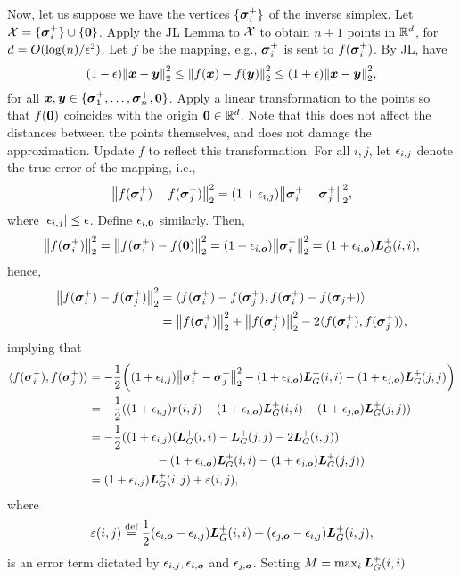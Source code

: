 

Now, let us suppose we have the vertices $\{\vb*{\sigma}_i^+\}$ of the inverse simplex. Let $\mathcal{X} = \{\vb*{\sigma}_i^+\}\cup\{\vb{0}\}$. Apply the JL Lemma to $\mathcal{X}$ to  obtain $n+1$ points in $\mathbb{R}^d$, for $d=O(\log(n)/\epsilon^2)$. Let $f$ be the mapping, e.g., $\vb*{\sigma}_i^+$ is sent to $f(\vb*{\sigma}_i^+)$. By JL, have 
\[(1-\epsilon)\norm{\vb*{x}-\vb*{y}}_2^2\leq  \norm{f(\vb*{x}) -f(\vb*{y})}_2^2\leq (1+\epsilon)\norm{\vb*{x}-\vb*{y}}_2^2, \]
for all $\vb*{x},\vb*{y}\in \{\vb*{\sigma}_1^+,\dots,\vb*{\sigma}_n^+,\vb{0}\}$. 
Apply a linear transformation to the points so that $f(\vb{0})$ coincides with the origin $\vb{0}\in\mathbb{R}^d$. Note that this does not affect the distances between the points themselves, and does not damage the approximation. Update $f$ to reflect this transformation. 
For all $i,j$, let $\epsilon_{i,j}$ denote the true error of the mapping, i.e., 
\[\norm{f(\vb*{\sigma}_i^+)-f(\vb*{\sigma}_j^+)}_2^2 = (1+\epsilon_{i,j})\norm{\vb*{\sigma}_i^+-\vb*{\sigma}_j^+}_2^2,\]
where $|\epsilon_{i,j}|\leq \epsilon$. Define $\epsilon_{i,\vb{0}}$ similarly. 
Then, 
\[\norm{f(\vb*{\sigma}_i^+)}_2^2 = \norm{f(\vb*{\sigma}_i^+)-f(\vb{0})}_2^2 = (1+\epsilon_{i,\vb*{o}})\norm{\vb*{\sigma}_i^+}_2^2 = (1+\epsilon_{i,\vb*{o}})\vb*{L}_G^+(i,i),\]
hence, 
\begin{align*}
\norm{f(\vb*{\sigma}_i^+)-f(\vb*{\sigma}_j^+)}_2^2 &= \langle f(\vb*{\sigma}_i^+)-f(\vb*{\sigma}_j^+),f(\vb*{\sigma}_i^+)-f(\vb*{\sigma}_j+)\rangle \\
&= \norm{f(\vb*{\sigma}_i^+)}_2^2 + \norm{f(\vb*{\sigma}_j^+)}_2^2 - 2\langle f(\vb*{\sigma}_i^+),f(\vb*{\sigma}_j^+)\rangle,  
\end{align*}
implying that 
\begin{align*}
\langle f(\vb*{\sigma}_i^+),f(\vb*{\sigma}_j^+) \rangle &= -\frac{1}{2} \bigg((1+\epsilon_{i,j})\norm{\vb*{\sigma}_i^+-\vb*{\sigma}_j^+}_2^2 - (1+\epsilon_{i,\vb*{o}})\vb*{L}_G^+(i,i) - (1+\epsilon_{j,\vb*{o}})\vb*{L}_G^+(j,j)\bigg) \\
&= -\frac{1}{2}((1+\epsilon_{i,j})r(i,j) - (1+\epsilon_{i,\vb*{o}})\vb*{L}_G^+(i,i) - (1+\epsilon_{j,\vb*{o}})\vb*{L}_G^+(j,j)) \\
&= -\frac{1}{2}((1+\epsilon_{i,j})(\vb*{L}_G^+(i,i) - \vb*{L}_G^+(j,j) - 2\vb*{L}_G^+(i,j)) \\
&\hspace{2cm}- (1+\epsilon_{i,\vb*{o}})\vb*{L}_G^+(i,i) - (1+\epsilon_{j,\vb*{o}})\vb*{L}_G^+(j,j))\\
&= (1+\epsilon_{i,j})\vb*{L}_G^+(i,j) + \varepsilon(i,j),
\end{align*}
where 
\[\varepsilon(i,j)\overset{\text{def}}{=} \frac{1}{2}(\epsilon_{i,\vb*{o}}-\epsilon_{i,j})\vb*{L}_G^+(i,i) + (\epsilon_{j,\vb*{o}}-\epsilon_{i,j})\vb*{L}_G^+(i,j),\]
is an error term dictated by $\epsilon_{i,j}, \epsilon_{i,\vb*{o}}$ and $\epsilon_{j,\vb*{o}}$. Setting $M= \max_i \vb*{L}_G^+(i,i)$ 
